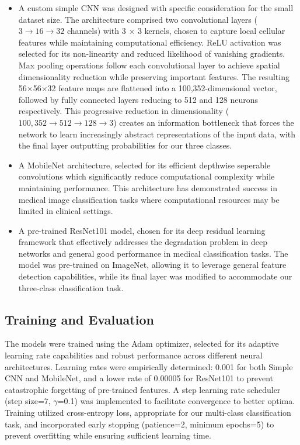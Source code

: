 \begin{itemize}
    \item A custom simple CNN was designed with specific consideration for the small dataset size. The architecture comprised two convolutional layers ($3\rightarrow 16 \rightarrow 32$ channels) with 3 $\times$ 3 kernels, chosen to capture local cellular features while maintaining computational efficiency. ReLU activation was selected for its non-linearity and reduced likelihood of vanishing gradients. Max pooling operations follow each convolutional layer to achieve spatial dimensionality reduction while preserving important features.  The resulting 56×56×32 feature maps are flattened into a 100,352-dimensional vector, followed by fully connected layers reducing to 512 and 128 neurons respectively. This progressive reduction in dimensionality ($100,352 \rightarrow 512 \rightarrow 128 \rightarrow 3$) creates an information bottleneck that forces the network to learn increasingly abstract representations of the input data, with the final layer outputting probabilities for our three classes. 
    \item A MobileNet architecture\cite{DBLP:journals/corr/HowardZCKWWAA17}, selected for its efficient depthwise seperable convolutions which significantly reduce computational complexity while maintaining performance. This architecture has demonstrated success in medical image classification tasks where computational resources may be limited in clinical settings.\cite{SHARMA2024637}
    \item A pre-trained ResNet101 model\cite{ResNet101}, chosen for its deep residual learning framework that effectively addresses the degradation problem in deep networks and general good performance in medical classification tasks\cite{https://doi.org/10.1155/2021/2485934}. The model was pre-trained on ImageNet, allowing it to leverage general feature detection capabilities, while its final layer was modified to accommodate our three-class classification task.
\end{itemize}



\subsection{Training and Evaluation}
The models were trained using the Adam optimizer, selected for its adaptive learning rate capabilities and robust performance across different neural architectures. Learning rates were empirically determined: 0.001 for both Simple CNN and MobileNet, and a lower rate of 0.00005 for ResNet101 to prevent catastrophic forgetting of pre-trained features. A step learning rate scheduler (step size=7, $\gamma$=0.1) was implemented to facilitate convergence to better optima. Training utilized cross-entropy loss, appropriate for our multi-class classification task, and incorporated early stopping (patience=2, minimum epochs=5) to prevent overfitting while ensuring sufficient learning time.

